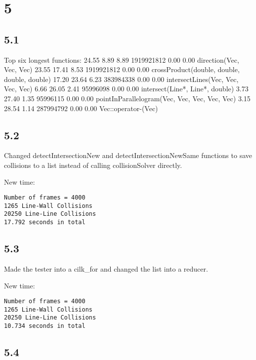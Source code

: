 \documentclass[12pt]{article}
\begin{document}
\section{5}
\subsection{5.1}
Top six longest functions:
  24.55      8.89     8.89 1919921812     0.00     0.00  direction(Vec, Vec, Vec)
  23.55     17.41     8.53 1919921812     0.00     0.00  crossProduct(double, double, double, double)
  17.20     23.64     6.23 383984338     0.00     0.00  intersectLines(Vec, Vec, Vec, Vec)
   6.66     26.05     2.41 95996098     0.00     0.00  intersect(Line*, Line*, double)
   3.73     27.40     1.35 95996115     0.00     0.00  pointInParallelogram(Vec, Vec, Vec, Vec, Vec)
   3.15     28.54     1.14 287994792     0.00     0.00  Vec::operator-(Vec)


\subsection{5.2}
Changed detectIntersectionNew and detectIntersectionNewSame functions to save 
collisions to a list instead of calling collisionSolver directly.  

New time:
\begin{verbatim}
Number of frames = 4000
1265 Line-Wall Collisions
20250 Line-Line Collisions
17.792 seconds in total
\end{verbatim}


\subsection{5.3}
Made the tester into a cilk_for and changed the list into a reducer.  

New time:
\begin{verbatim}
Number of frames = 4000
1265 Line-Wall Collisions
20250 Line-Line Collisions
10.734 seconds in total
\end{verbatim}


\subsection{5.4}
\end{document}
